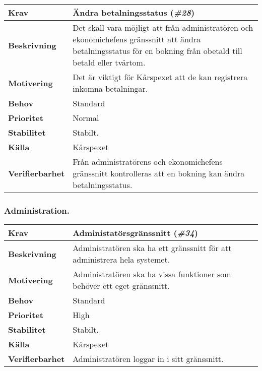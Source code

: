 \documentclass[a4paper, twoside, 11pt, titlepage]{article}
\begin{document}
		\begin{tabular} { p{2.6cm} p{12.5cm} }
			\hline
			\sffamily\textbf{Krav} & Ändra betalningsstatus (\emph{\#28})  \\
			\hline
			\sffamily\textbf{Beskrivning} & Det skall vara möjligt att från administratören och ekonomichefens gränssnitt att ändra betalningsstatus för en bokning från obetald till betald eller tvärtom.  \\
			\hline
			\sffamily\textbf{Motivering} & Det är viktigt för Kårspexet att de kan registrera inkomna betalningar.  \\
			\hline
			\sffamily\textbf{Behov} & Standard  \\
			\hline
			\sffamily\textbf{Prioritet} & Normal  \\
			\hline
			\sffamily\textbf{Stabilitet} & Stabilt.  \\
			\hline
			\sffamily\textbf{Källa} & Kårspexet  \\
			\hline
			\sffamily\textbf{Verifierbarhet} & Från administratörens och ekonomichefens gränssnitt kontrolleras att en bokning kan ändra betalningsstatus.  \\
			\hline
		\end{tabular}


		\subsubsection{Administration.}


		\begin{tabular} { p{2.6cm} p{12.5cm} }
			\hline
			\sffamily\textbf{Krav} & Administatörsgränssnitt (\emph{\#34})  \\
			\hline
			\sffamily\textbf{Beskrivning} & Administratören ska ha ett gränssnitt för att administrera hela systemet.  \\
			\hline
			\sffamily\textbf{Motivering} & Administratören ska ha vissa funktioner som behöver ett eget gränssnitt.  \\
			\hline
			\sffamily\textbf{Behov} & Standard  \\
			\hline
			\sffamily\textbf{Prioritet} & High  \\
			\hline
			\sffamily\textbf{Stabilitet} & Stabilt.  \\
			\hline
			\sffamily\textbf{Källa} & Kårspexet  \\
			\hline
			\sffamily\textbf{Verifierbarhet} & Administratören loggar in i sitt gränssnitt.   \\
			\hline
		\end{tabular}
		\vspace{6mm}
\end{document}
